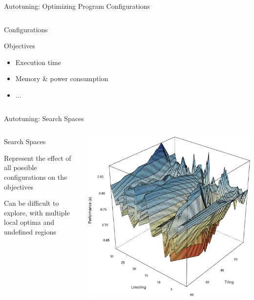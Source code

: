 \documentclass[10pt, compress, aspectratio=169, xcolor={table,usenames,dvipsnames}]{beamer}
\begin{document}
\begin{frame}[label={sec:org42c2b6f},fragile]{Autotuning: Optimizing Program Configurations}
\begin{columns}
\begin{column}{0.5\columnwidth}
\begin{block}{Configurations}
\begin{itemize}
\vspace{-.2cm}
\end{itemize}

\begin{block}{Objectives}
\begin{itemize}
\item Execution time
\item Memory \& power consumption
\item \(\dots\)
\end{itemize}
\end{block}
\end{block}
\end{column}
\end{columns}
\end{frame}

\begin{frame}[label={sec:orge46b803}]{Autotuning: Search Spaces}
\begin{columns}
\begin{column}{0.4\columnwidth}
\begin{block}{Search Spaces}
\vspace{.2cm}

Represent the \alert{effect} of all possible
configurations on the objectives

Can be difficult to explore, with multiple \alert{local optima}
and \alert{undefined regions}
\end{block}
\end{column}

\begin{column}{0.6\columnwidth}
\begin{center}
\begin{center}
\includegraphics[width=.8\columnwidth]{../../../img/bicgkernel_averaged_search_space_edited.pdf}
\end{center}


\end{center}
\end{column}
\end{columns}
\end{frame}
\end{document}
